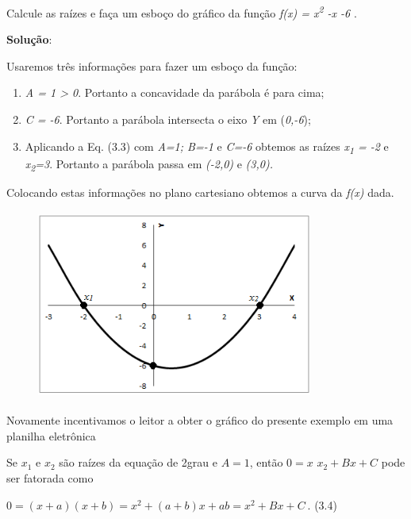 \begin{texemplo}
Calcule as raízes e faça um esboço do gráfico da função \textit{f(x) = x\textsuperscript{2} -x -6} . 

\textbf{Solução}: 

Usaremos três informações para fazer um esboço da função:

\begin{enumerate}
	\item \textit{A = 1 > 0}. Portanto a concavidade da parábola é para cima;

	\item \textit{C = -6}. Portanto a parábola intersecta o eixo \textit{Y} em (\textit{0,-6});

	\item Aplicando a Eq. (3.3) com \textit{A=1; B=-1 }e\textit{ C=-6 }obtemos as raízes \textit{x\textsubscript{1} = -2}  e  \textit{x\textsubscript{2}=3}. Portanto a parábola passa em \textit{(-2,0) }e\textit{ (3,0).} 
\end{enumerate}

Colocando estas informações no plano cartesiano obtemos a curva da \textit{f(x)} dada.

\begin{figure}[H]
	\begin{Center}
		\includegraphics[width=3.57in,height=2.45in]{capitulos/funcao_do_segundo_grau/media/image5.png}
	\end{Center}
\end{figure}

Novamente incentivamos o leitor a obter o gráfico do presente exemplo em uma planilha eletrônica \qedsymbol{}
\end{texemplo}

Se $x_1$ e $x_2$ são raízes da equação de 2\degree grau e $A = 1$, então $0 = x$
$x_2 + Bx + C$ pode ser fatorada como

    \( 0= \left( x+a \right)  \left( x+b \right) =x^{2}+ \left( a+b \right) x+ab= x^{2}+Bx+C_{~ } \). \tab (3.4)

